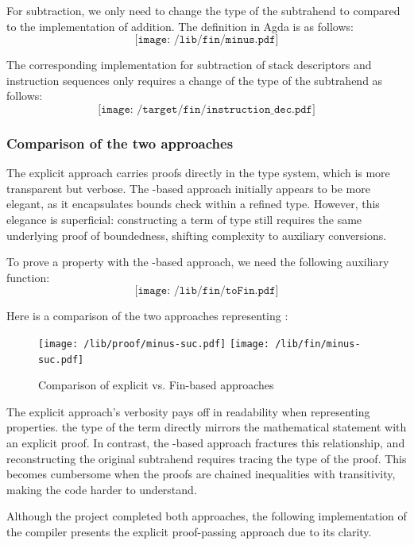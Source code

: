 \documentclass[12pt,a4paper]{report}
\theoremstyle{definition}
\newcommand{\mb}[1]{\textcolor{mediumblue}{#1}}
\newcommand{\gn}[1]{\textcolor{green}{#1}}
\begin{document}
    For subtraction, we only need to change the type of the subtrahend to \text{\mb{\mathsf{Fin}}\ (\gn{\mathsf{suc}}\ n)} compared to the implementation of addition. The definition in Agda is as follows:
    \[\texttt{[image: /lib/fin/minus.pdf]}\]

    The corresponding implementation for subtraction of stack descriptors and instruction sequences only requires a change of the type of the subtrahend as follows:
    \[\texttt{[image: /target/fin/instruction\_dec.pdf]}\]

    \subsubsection{Comparison of the two approaches}
    The explicit approach carries proofs directly in the type system, which is more transparent but verbose. The -based approach initially appears to be more elegant, as it encapsulates bounds check within a refined type. However, this elegance is superficial: constructing a term of type \text{\mb{\mathsf{Fin}}\ n} still requires the same underlying proof of boundedness, shifting complexity to auxiliary conversions. 
    
    To prove a property with the -based approach, we need the following auxiliary function:
    \[\texttt{[image: /lib/fin/toFin.pdf]}\]

    Here is a comparison of the two approaches representing  :
    \begin{figure}[H]
        \centering
        \texttt{[image: /lib/proof/minus-suc.pdf]}
        \texttt{[image: /lib/fin/minus-suc.pdf]}
        \caption{Comparison of explicit vs. \textsf{Fin}-based approaches}
        \label{fig: fin_comparison}
    \end{figure}
    The explicit approach's verbosity pays off in readability when representing properties. the type of the term directly mirrors the mathematical statement with an explicit proof. In contrast, the -based approach fractures this relationship, and reconstructing the original subtrahend requires tracing the type of the proof. This becomes cumbersome when the proofs are chained inequalities with transitivity, making the code harder to understand.

    Although the project completed both approaches, the following implementation of the compiler presents the explicit proof-passing approach due to its clarity.
\end{document}
